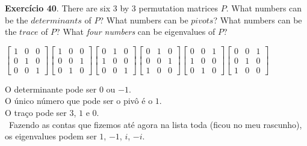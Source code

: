 \documentclass[12pt]{article}
\begin{document}
\textbf{Exercício 40}. There are six 3 by 3 permutation matrices $P$. What numbers can be the $determinants$ of $P$? What numbers can be $pivots$? What numbers can be the $trace$ of $P$? What \textit{four numbers} can be eigenvalues of $P$?\\
\begin{center}
  $
  \begin{bmatrix}
    1 & 0 & 0 \\
    0 & 1 & 0 \\
    0 & 0 & 1
  \end{bmatrix}
  \begin{bmatrix}
    1 & 0 & 0 \\
    0 & 0 & 1 \\
    0 & 1 & 0
  \end{bmatrix}
  \begin{bmatrix}
    0 & 1 & 0 \\
    1 & 0 & 0 \\
    0 & 0 & 1
  \end{bmatrix}
  \begin{bmatrix}
    0 & 1 & 0 \\
    0 & 0 & 1 \\
    1 & 0 & 0
  \end{bmatrix}
  \begin{bmatrix}
    0 & 0 & 1 \\
    1 & 0 & 0 \\
    0 & 1 & 0
  \end{bmatrix}
  \begin{bmatrix}
    0 & 0 & 1 \\
    0 & 1 & 0 \\
    1 & 0 & 0
  \end{bmatrix}
  $
\end{center}
O determinante pode ser $0$ ou $-1$.\\
O único número que pode ser o pivô é o $1$.\\
O traço pode ser $3$, $1$ e $0$.\\\
Fazendo as contas que fizemos até agora na lista toda (ficou no meu rascunho), os eigenvalues podem ser $1$, $-1$, $i$, $-i$. 
\end{document}
